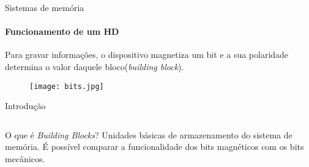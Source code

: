 \begin{frame}[t]{Sistemas de memória}
    \transboxout[duration=0.5]
    \framesubtitle{Funcionamento de um HD}    %
    Para gravar informações, o dispositivo magnetiza um bit e a sua polaridade determina o valor daquele bloco(\textit{building block}).


    \begin{figure}
        \texttt{[image: bits.jpg]}
    \end{figure}
\end{frame}

\begin{frame}[t]{Introdução}
    \transboxout[duration=0.5]
    \begin{columns}
    \end{columns}

    \begin{block}{O que é \textit{Building Blocks}?}
        Unidades básicas de armazenamento do sistema de memória. É possível comparar a funcionalidade dos bits magnéticos com os bits mecânicos.
    \end{block}
\end{frame}
